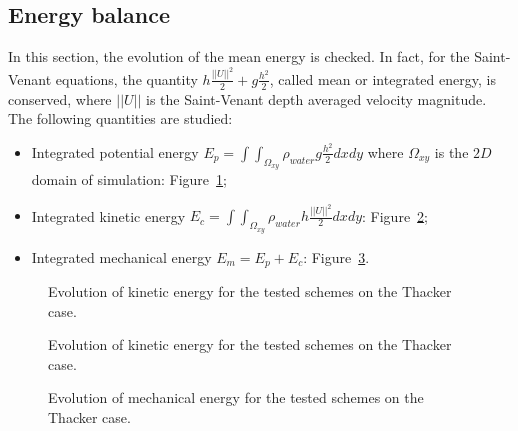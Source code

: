 \subsection{Energy balance}

In this section, the evolution of the mean energy is checked. In fact, for the Saint-Venant equations,
the quantity $h \frac{||U||^2}{2} + g \frac{h^2}{2}$, called mean or integrated energy, is conserved,
where $||U||$ is the Saint-Venant depth averaged velocity magnitude.
The following quantities are studied:
\begin{itemize}
\item Integrated potential energy \textbf{$E_p =\int\int_{\Omega_{xy}}\rho_{water} g \frac{h^2}{2} dxdy$} where $\Omega_{xy}$ is the $2D$ domain of simulation: Figure~\ref{fig:ritter:Ep};
\item Integrated kinetic energy \textbf{$E_c =\int\int_{\Omega_{xy}} \rho_{water} h \frac{||U||^2}{2} dxdy$}: Figure~\ref{fig:ritter:Ec};
\item Integrated mechanical energy \textbf{$E_m = E_p + E_c$}: Figure~\ref{fig:ritter:Em}.
\end{itemize}

\begin{figure}[H]
\centering
  \caption{Evolution of kinetic energy for the tested schemes on the Thacker case.}
\label{fig:ritter:Ep}
\end{figure}

\begin{figure}[H]
\centering
  \caption{Evolution of kinetic energy for the tested schemes on the Thacker case.}
\label{fig:ritter:Ec}
\end{figure}

\begin{figure}[H]
\centering
  \caption{Evolution of mechanical energy for the tested schemes on the Thacker case.}
\label{fig:ritter:Em}
\end{figure}

